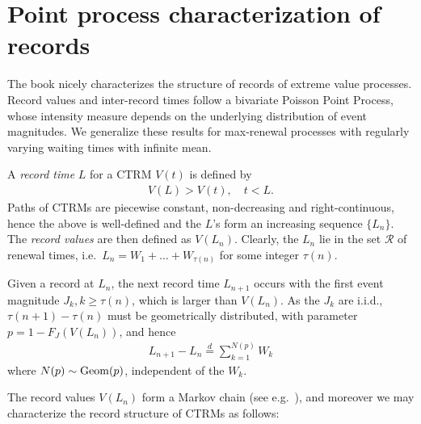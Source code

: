 \documentclass[12pt, a4paper]{article}
\newcommand{\1}{\mathbf 1}
\begin{document}
\section{Point process characterization of records}
\label{sec:records}

The book \cite[Chapter 4]{resnick2013extreme} nicely characterizes the structure of records of extreme value processes. Record values and inter-record times follow a bivariate Poisson Point Process, whose intensity measure depends on the underlying distribution of event magnitudes. We generalize these results for max-renewal processes with regularly varying waiting times with infinite mean. 

A \textit{record time} $L$ for a CTRM $V(t)$ is defined by 
\begin{align*}
V(L) > V(t), \quad t < L.
\end{align*}
Paths of CTRMs are piecewise constant, non-decreasing and right-continuous, hence the above is well-defined and the $L$'s form an increasing sequence $\{L_n\}$. The \textit{record values} are then defined as $V(L_n)$. Clearly, the $L_n$ lie in the set $\mathcal R$ of renewal times, i.e.\ $L_n = W_1 + \ldots + W_{\tau(n)}$ for some integer $\tau(n)$. 

Given a record at $L_n$, the next record time $L_{n+1}$ occurs with the first event magnitude $J_k, k \ge \tau(n)$, which is larger than $V(L_n)$. As the $J_k$ are i.i.d., $\tau(n+1) - \tau(n)$ must be geometrically distributed, with parameter $p = 1 - F_J(V(L_n))$, and hence 
\begin{align} \label{eq:geometric-sum}
L_{n+1} - L_n \stackrel{d}{=} \sum_{k=1}^{N(p)} W_k
\end{align}
where $N(p) \sim {\rm Geom}(p)$, independent of the $W_k$. 

The record values $V(L_n)$ form a Markov chain (see e.g.\ \cite{resnick2013extreme}), and moreover we may characterize the record structure of CTRMs as follows: 
\end{document}

